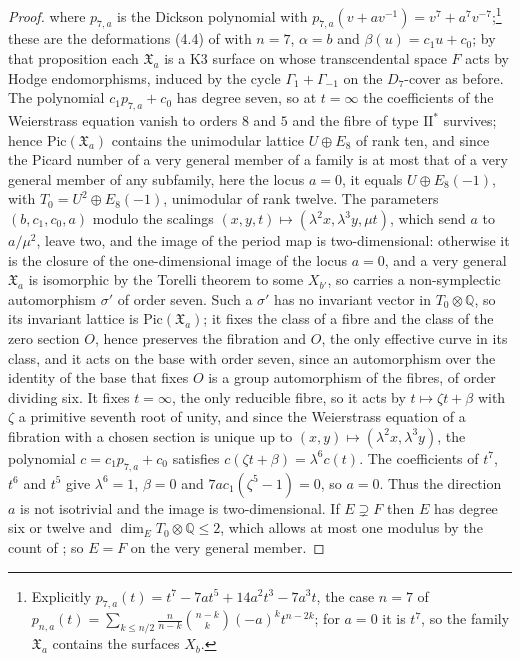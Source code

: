\documentclass[11pt,reqno]{amsart}
\numberwithin{equation}{section}
\theoremstyle{plain}
\theoremstyle{definition}
\newcommand{\QQ}{\mathbb{Q}}
\newcommand{\Pic}{\mathrm{Pic}}
\begin{document}
\begin{proof}
where $p_{7,a}$ is the Dickson polynomial with $p_{7,a}(v+av^{-1})=v^{7}+a^{7}v^{-7}$;\footnote{Explicitly $p_{7,a}(t)=t^{7}-7at^{5}+14a^{2}t^{3}-7a^{3}t$, the case $n=7$ of $p_{n,a}(t)=\sum_{k\le n/2}\frac{n}{n-k}\binom{n-k}{k}(-a)^{k}t^{n-2k}$; for $a=0$ it is $t^{7}$, so the family $\mathfrak{X}_{a}$ contains the surfaces $X_{b}$.} these are the deformations (4.4) of \cite[Prop.~4.6]{vGS25} with $n=7$, $\alpha=b$ and $\beta(u)=c_{1}u+c_{0}$; by that proposition each $\mathfrak{X}_{a}$ is a K3 surface on whose transcendental space $F$ acts by Hodge endomorphisms, induced by the cycle $\Gamma_{1}+\Gamma_{-1}$ on the $D_{7}$-cover as before. The polynomial $c_{1}p_{7,a}+c_{0}$ has degree seven, so at $t=\infty$ the coefficients of the Weierstrass equation vanish to orders $8$ and $5$ and the fibre of type $\mathrm{II}^{*}$ survives; hence $\Pic(\mathfrak{X}_{a})$ contains the unimodular lattice $U\oplus E_{8}$ of rank ten, and since the Picard number of a very general member of a family is at most that of a very general member of any subfamily, here the locus $a=0$, it equals $U\oplus E_{8}(-1)$, with $T_{0}=U^{2}\oplus E_{8}(-1)$, unimodular of rank twelve. The parameters $(b,c_{1},c_{0},a)$ modulo the scalings $(x,y,t)\mapsto(\lambda^{2}x,\lambda^{3}y,\mu t)$, which send $a$ to $a/\mu^{2}$, leave two, and the image of the period map is two-dimensional: otherwise it is the closure of the one-dimensional image of the locus $a=0$, and a very general $\mathfrak{X}_{a}$ is isomorphic by the Torelli theorem to some $X_{b'}$, so carries a non-symplectic automorphism $\sigma'$ of order seven. Such a $\sigma'$ has no invariant vector in $T_{0}\otimes\QQ$, so its invariant lattice is $\Pic(\mathfrak{X}_{a})$; it fixes the class of a fibre and the class of the zero section $O$, hence preserves the fibration and $O$, the only effective curve in its class, and it acts on the base with order seven, since an automorphism over the identity of the base that fixes $O$ is a group automorphism of the fibres, of order dividing six. It fixes $t=\infty$, the only reducible fibre, so it acts by $t\mapsto\zeta t+\beta$ with $\zeta$ a primitive seventh root of unity, and since the Weierstrass equation of a fibration with a chosen section is unique up to $(x,y)\mapsto(\lambda^{2}x,\lambda^{3}y)$, the polynomial $c=c_{1}p_{7,a}+c_{0}$ satisfies $c(\zeta t+\beta)=\lambda^{6}c(t)$. The coefficients of $t^{7}$, $t^{6}$ and $t^{5}$ give $\lambda^{6}=1$, $\beta=0$ and $7ac_{1}(\zeta^{5}-1)=0$, so $a=0$. Thus the direction $a$ is not isotrivial and the image is two-dimensional. If $E\supsetneq F$ then $E$ has degree six or twelve and $\dim_{E}T_{0}\otimes\QQ\le2$, which allows at most one modulus by the count of \cite[\S5.4]{vGS25}; so $E=F$ on the very general member.


\end{proof}
\end{document}
